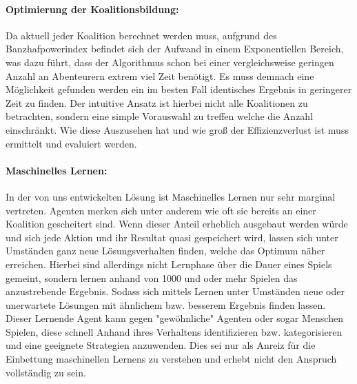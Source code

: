 \documentclass[fleqn,10pt]{SelfArx} %
\begin{document}
\paragraph{Optimierung der Koalitionsbildung:}
Da aktuell jeder Koalition berechnet werden muss, aufgrund des Banzhafpowerindex befindet sich der Aufwand in einem Exponentiellen Bereich, was dazu führt, dass der Algorithmus schon bei einer vergleichsweise geringen Anzahl an Abenteurern extrem viel Zeit benötigt. Es muss demnach eine Möglichkeit gefunden werden ein im besten Fall identisches Ergebnis in geringerer Zeit zu finden. Der intuitive Ansatz ist hierbei nicht alle Koalitionen zu betrachten, sondern eine simple Vorauswahl zu treffen welche die Anzahl einschränkt. Wie diese Auszusehen hat und wie groß der Effizienzverlust ist muss ermittelt und evaluiert werden.

\paragraph{Maschinelles Lernen:} 
In der von uns entwickelten Lösung ist Maschinelles Lernen nur sehr marginal vertreten. Agenten merken sich unter anderem wie oft sie bereits an einer Koalition gescheitert sind. Wenn dieser Anteil erheblich ausgebaut werden würde und sich jede Aktion und ihr Resultat quasi gespeichert wird, lassen sich unter Umständen ganz neue Lösungsverhalten finden, welche das Optimum näher erreichen. Hierbei sind allerdings nicht Lernphase über die Dauer eines Spiels gemeint, sondern lernen anhand von 1000 und oder mehr Spielen das anzustrebende Ergebnis. Sodass sich mittels Lernen unter Umständen neue oder unerwartete Lösungen mit ähnlichem bzw. besserem Ergebnis finden lassen. Dieser Lernende Agent kann gegen "gewöhnliche" Agenten oder sogar Menschen Spielen, diese schnell Anhand ihres Verhaltens identifizieren bzw. kategorisieren und eine geeignete Strategien anzuwenden. Dies sei nur als Anreiz für die Einbettung maschinellen Lernens zu verstehen und erhebt nicht den Anspruch vollständig zu sein.
\end{document}
